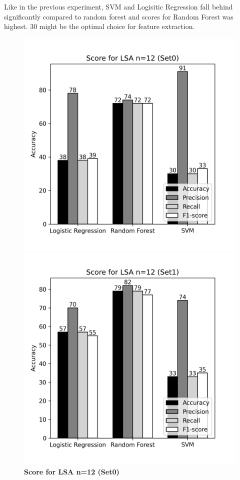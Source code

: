 \documentclass[12pt]{report}
\begin{document}
             Like in the previous experiment, SVM and Logisitic Regression fall behind significantly compared to random forest and scores for Random Forest was highest.
             30 might be the optimal choice for feature extraction.


             \begin{figure}[!htb]
                \begin{minipage}{0.48\textwidth}
                  \centering
                  \includegraphics[scale=0.55]{plots/Score for LSA n=12 (Set0).png}
                  \caption{\textbf{Score for LSA n=12 (Set0)}}\label{Fig:typo1}
                \end{minipage}\hfill
                \begin{minipage}{0.48\textwidth}
                  \centering
                  \includegraphics[scale=0.55]{plots/Score for LSA n=12 (Set1).png}

\end{minipage}
\end{figure}
\end{document}
